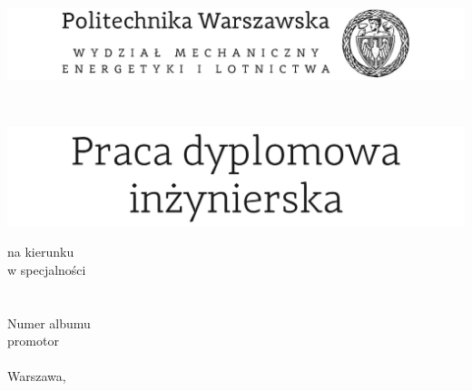 \begin{titlepage}
\begingroup
\begin{center}		
			\includegraphics[width=1.0\textwidth]{img/pw_header}
			
			\vspace{1.3cm}
			\fontsize{12}{14}\selectfont\myDepartment \\ \bigskip
			
			\vspace{1.0cm}
			\includegraphics[width=1.0\textwidth]{img/pw_title}
			
			na kierunku \myCourse \\
			w specjalności \mySpecialization \\
			\vspace{1cm}
			{\fontsize{14}{18}\selectfont \myTitle} \\ 
			
			\vspace{1.5cm}
			\fontsize{21}{25}\selectfont \myName \\
			\fontsize{12}{14}\selectfont
			Numer albumu \myNumber \\
			\vspace{1.5cm}
			promotor \\
			\myProf \\
			\vfill 
			Warszawa, \myYear
        \vfill                      
\end{center}
\endgroup
\end{titlepage}